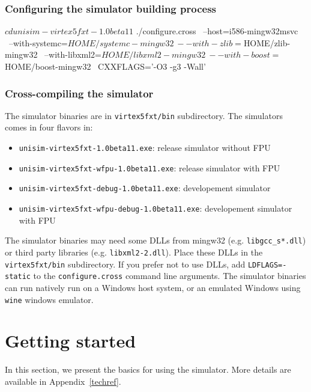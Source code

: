\subsubsection{Configuring the simulator building process}
\begin{script}
  $ cd unisim-virtex5fxt-1.0beta11
  $ ./configure.cross \
          --host=i586-mingw32msvc \
          --with-systemc=${HOME}/systemc-mingw32 \
          --with-zlib=${HOME}/zlib-mingw32 \
          --with-libxml2=${HOME}/libxml2-mingw32 \
          --with-boost=${HOME}/boost-mingw32 \
          CXXFLAGS='-O3 -g3 -Wall'
\end{script}

\subsubsection{Cross-compiling the simulator}
\begin{script}
   $ make -f Makefile.cross
\end{script}

\noindent The simulator binaries are in \texttt{virtex5fxt/bin} subdirectory.
The simulators comes in four flavors in:
\begin{itemize}
\item \texttt{unisim-virtex5fxt-1.0beta11.exe}: release simulator without FPU
\item \texttt{unisim-virtex5fxt-wfpu-1.0beta11.exe}: release simulator with FPU
\item \texttt{unisim-virtex5fxt-debug-1.0beta11.exe}: developement simulator
\item \texttt{unisim-virtex5fxt-wfpu-debug-1.0beta11.exe}: developement simulator with FPU
\end{itemize}

The simulator binaries may need some DLLs from mingw32 (e.g. \texttt{libgcc\_s*.dll}) or third party libraries (e.g. \texttt{libxml2-2.dll}).
Place these DLLs in the \texttt{virtex5fxt/bin} subdirectory.
If you prefer not to use DLLs, add \texttt{LDFLAGS=-static} to the \texttt{configure.cross} command line arguments.
The simulator binaries can run natively run on a Windows host system, or an emulated Windows using \texttt{wine} windows emulator.

\section{Getting started}
\label{getting_started}

In this section, we present the basics for using the simulator.
More details are available in Appendix~\ref{techref}.


